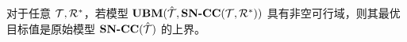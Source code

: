 \begin{theorem}
    \label{thm:valid_upper_bound}
    对于任意 $\mathcal{T}, \mathcal{R}^{*}$，若模型 $\textbf{UBM}(\hat{\mathcal{T}}, \textbf{SN-CC}({\mathcal{T}, \mathcal{R}^{*}}))$ 具有非空可行域，则其最优目标值是原始模型 $\textbf{SN-CC}({\hat{\mathcal{T}}})$ 的上界。
\end{theorem}